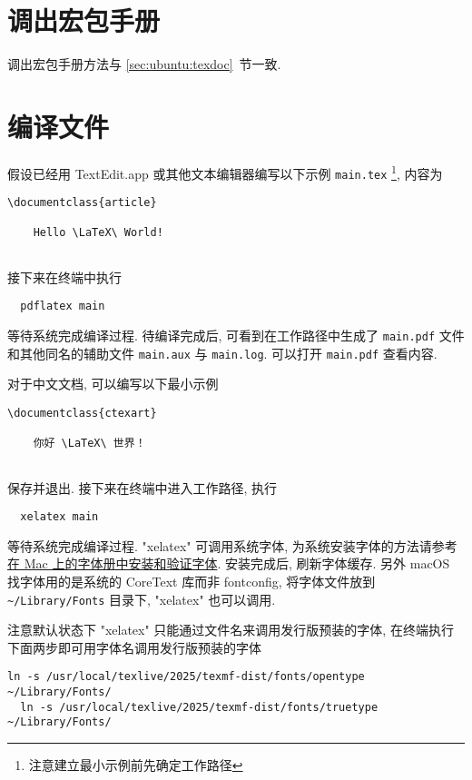 \section{调出宏包手册}

调出宏包手册方法与 \ref{sec:ubuntu:texdoc}~节一致.

\section{编译文件}

假设已经用 TextEdit.app 或其他文本编辑器编写以下示例 \texttt{main.tex}%
\footnote{注意建立最小示例前先确定工作路径},
内容为
\begin{lstlisting}[language = mwe]
  \documentclass{article}
  
    Hello \LaTeX\ World!
  
\end{lstlisting}
接下来在\textsf{终端}中执行
\begin{lstlisting}
  pdflatex main
\end{lstlisting}
等待系统完成编译过程. 
待编译完成后, 可看到在工作路径中生成了 \texttt{main.pdf}
文件和其他同名的辅助文件 \texttt{main.aux} 与 \texttt{main.log}.
可以打开 \texttt{main.pdf} 查看内容.

对于中文文档, 可以编写以下最小示例%
\begin{lstlisting}[language = mwe]
  \documentclass{ctexart}
  
    你好 \LaTeX\ 世界！
  
\end{lstlisting}
保存并退出.
接下来在\textsf{终端}中进入工作路径,
执行
\begin{lstlisting}
  xelatex main
\end{lstlisting}
等待系统完成编译过程.
"xelatex" 可调用系统字体,
为系统安装字体的方法请参考%
\href{https://support.apple.com/zh-cn/guide/font-book/fntbk1000/mac}{在 Mac 上的字体册中安装和验证字体}.
安装完成后, 刷新字体缓存.
另外 macOS 找字体用的是系统的 CoreText 库而非 fontconfig,
将字体文件放到 \verb+~/Library/Fonts+ 目录下,
"xelatex" 也可以调用.

注意默认状态下 "xelatex" 只能通过文件名来调用发行版预装的字体,
在\textsf{终端}执行下面两步即可用字体名调用发行版预装的字体
\begin{lstlisting}[deletekeywords = local]
  ln -s /usr/local/texlive/2025/texmf-dist/fonts/opentype ~/Library/Fonts/
  ln -s /usr/local/texlive/2025/texmf-dist/fonts/truetype ~/Library/Fonts/
\end{lstlisting}

